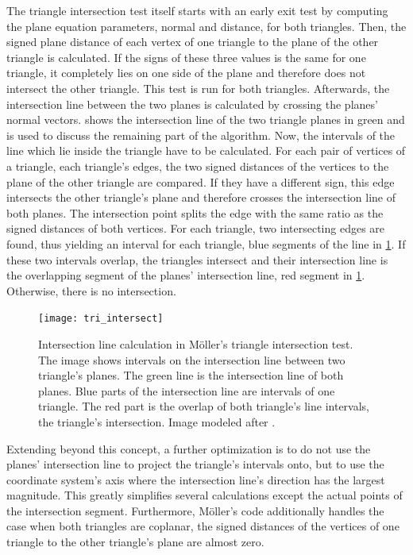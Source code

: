 The triangle intersection test itself starts with an early exit test by computing the plane equation parameters, \ie normal and distance, for both triangles.
Then, the signed plane distance of each vertex of one triangle to the plane of the other triangle is calculated.
If the signs of these three values is the same for one triangle, it completely lies on one side of the plane and therefore does not intersect the other triangle.
This test is run for both triangles.
Afterwards, the intersection line between the two planes is calculated by crossing the planes' normal vectors.
 shows the intersection line of the two triangle planes in green and is used to discuss the remaining part of the algorithm.
Now, the intervals of the line which lie inside the triangle have to be calculated.
For each pair of vertices of a triangle, \ie each triangle's edges, the two signed distances of the vertices to the plane of the other triangle are compared.
If they have a different sign, this edge intersects the other triangle's plane and therefore crosses the intersection line of both planes.
The intersection point splits the edge with the same ratio as the signed distances of both vertices.
For each triangle, two intersecting edges are found, thus yielding an interval for each triangle, \cf blue segments of the line in \cref{fig:tri_intersect}.
If these two intervals overlap, the triangles intersect and their intersection line is the overlapping segment of the planes' intersection line, \cf red segment in \cref{fig:tri_intersect}.
Otherwise, there is no intersection.

\begin{figure}
	\centering
	\texttt{[image: tri\_intersect]}
	\caption{
		Intersection line calculation in Möller's triangle intersection test.
		The image shows intervals on the intersection line between two triangle's planes.
		The green line is the intersection line of both planes.
		Blue parts of the intersection line are intervals of one triangle.
		The red part is the overlap of both triangle's line intervals, \ie the triangle's intersection.
		Image modeled after \cite[p757]{tri_tri_intersection_moller_image}.
	}
	\label{fig:tri_intersect}
\end{figure}

Extending beyond this concept, a further optimization is to do not use the planes' intersection line to project the triangle's intervals onto, but to use the coordinate system's axis where the intersection line's direction has the largest magnitude.
This greatly simplifies several calculations except the actual points of the intersection segment.
Furthermore, Möller's code additionally handles the case when both triangles are coplanar, \ie the signed distances of the vertices of one triangle to the other triangle's plane are almost zero.



